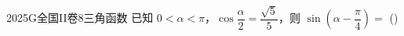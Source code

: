 
\begin{problem}{2025}{G}{全国II卷}{8}{三角函数}
已知 $0<\alpha<\pi$，$\cos \dfrac{\alpha}{2} = \dfrac{\sqrt{5}}{5}$，则 $\sin\left(\alpha-\dfrac{\pi}{4}\right)=$
(\hspace{1cm})
\begin{choices}
\end{choices}
\end{problem}
